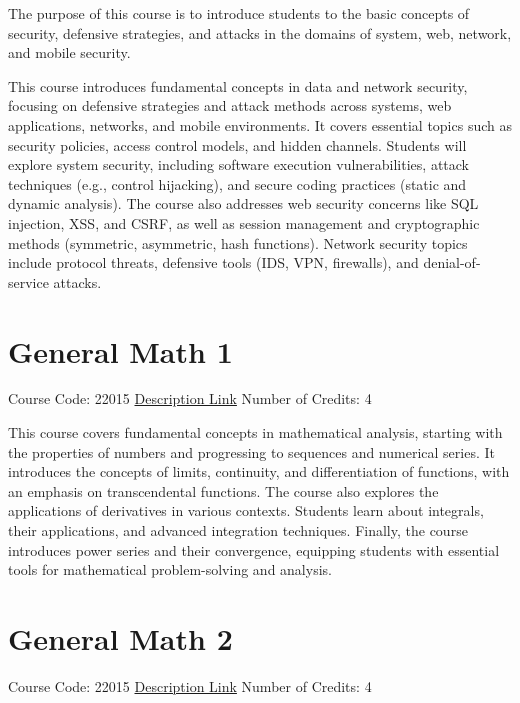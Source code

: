 The purpose of this course is to introduce students to the basic concepts of security, defensive strategies, and attacks in the domains of system, web, network, and mobile security.

This course introduces fundamental concepts in data and network security, focusing on defensive strategies and attack methods across systems, web applications, networks, and mobile environments. It covers essential topics such as security policies, access control models, and hidden channels. Students will explore system security, including software execution vulnerabilities, attack techniques (e.g., control hijacking), and secure coding practices (static and dynamic analysis). The course also addresses web security concerns like SQL injection, XSS, and CSRF, as well as session management and cryptographic methods (symmetric, asymmetric, hash functions). Network security topics include protocol threats, defensive tools (IDS, VPN, firewalls), and denial-of-service attacks.

\section{General Math 1}
Course Code: 22015 \qquad \quad \href{https://docs.ce.sharif.edu/course/22015}{Description Link}
\qquad \quad Number of Credits: 4

This course covers fundamental concepts in mathematical analysis, starting with the properties of numbers and progressing to sequences and numerical series. It introduces the concepts of limits, continuity, and differentiation of functions, with an emphasis on transcendental functions. The course also explores the applications of derivatives in various contexts. Students learn about integrals, their applications, and advanced integration techniques. Finally, the course introduces power series and their convergence, equipping students with essential tools for mathematical problem-solving and analysis.

\section{General Math 2}
Course Code: 22015 \qquad \quad \href{https://docs.ce.sharif.edu/course/22015}{Description Link}
\qquad \quad Number of Credits: 4

